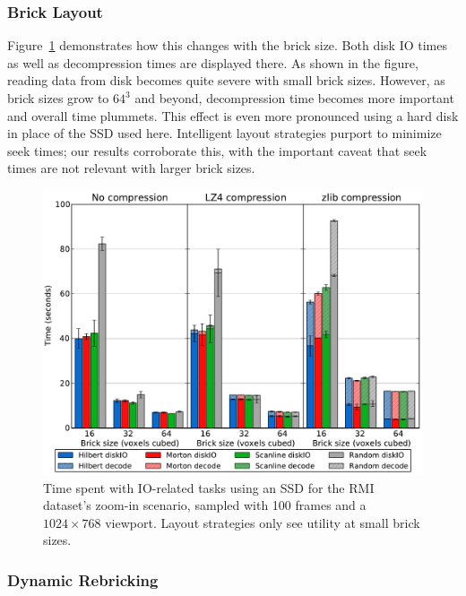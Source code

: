 \subsubsection{Brick Layout}

Figure~\ref{figrg:layout} demonstrates how this changes with the brick
size.  Both disk IO times as well as decompression times are displayed
there.  As shown in the figure, reading data from disk becomes quite
severe with small brick sizes.  However, as brick sizes grow to $64^3$
and beyond, decompression time becomes more important and overall time
plummets.  This effect is even more pronounced using a hard disk in
place of the SSD used here.  Intelligent layout strategies purport to
minimize seek times; our results corroborate this, with the important
caveat that seek times are not relevant with larger brick sizes.

\begin{figure}[tb]
  \centering
  \includegraphics[width=1.00\linewidth]{images/rg/brickIO-RichtmyerMeshkov-ZoomIn-SSD.pdf}

  \caption{Time spent with IO-related tasks using an SSD for the
  RMI dataset's zoom-in scenario, sampled with 100 frames and a
  $1024\times768$ viewport.  Layout strategies only see utility at
  small brick sizes.}

  \label{figrg:layout}
\end{figure}

\subsubsection{Dynamic Rebricking}
\label{sec:rebricking}

